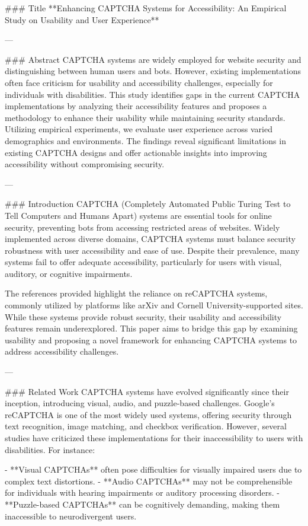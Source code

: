 ### Title  
**Enhancing CAPTCHA Systems for Accessibility: An Empirical Study on Usability and User Experience**

---

### Abstract  
CAPTCHA systems are widely employed for website security and distinguishing between human users and bots. However, existing implementations often face criticism for usability and accessibility challenges, especially for individuals with disabilities. This study identifies gaps in the current CAPTCHA implementations by analyzing their accessibility features and proposes a methodology to enhance their usability while maintaining security standards. Utilizing empirical experiments, we evaluate user experience across varied demographics and environments. The findings reveal significant limitations in existing CAPTCHA designs and offer actionable insights into improving accessibility without compromising security.

---

### Introduction  
CAPTCHA (Completely Automated Public Turing Test to Tell Computers and Humans Apart) systems are essential tools for online security, preventing bots from accessing restricted areas of websites. Widely implemented across diverse domains, CAPTCHA systems must balance security robustness with user accessibility and ease of use. Despite their prevalence, many systems fail to offer adequate accessibility, particularly for users with visual, auditory, or cognitive impairments.

The references provided highlight the reliance on reCAPTCHA systems, commonly utilized by platforms like arXiv and Cornell University-supported sites. While these systems provide robust security, their usability and accessibility features remain underexplored. This paper aims to bridge this gap by examining usability and proposing a novel framework for enhancing CAPTCHA systems to address accessibility challenges.

---

### Related Work  
CAPTCHA systems have evolved significantly since their inception, introducing visual, audio, and puzzle-based challenges. Google's reCAPTCHA is one of the most widely used systems, offering security through text recognition, image matching, and checkbox verification. However, several studies have criticized these implementations for their inaccessibility to users with disabilities. For instance:

- **Visual CAPTCHAs** often pose difficulties for visually impaired users due to complex text distortions.
- **Audio CAPTCHAs** may not be comprehensible for individuals with hearing impairments or auditory processing disorders.
- **Puzzle-based CAPTCHAs** can be cognitively demanding, making them inaccessible to neurodivergent users.


